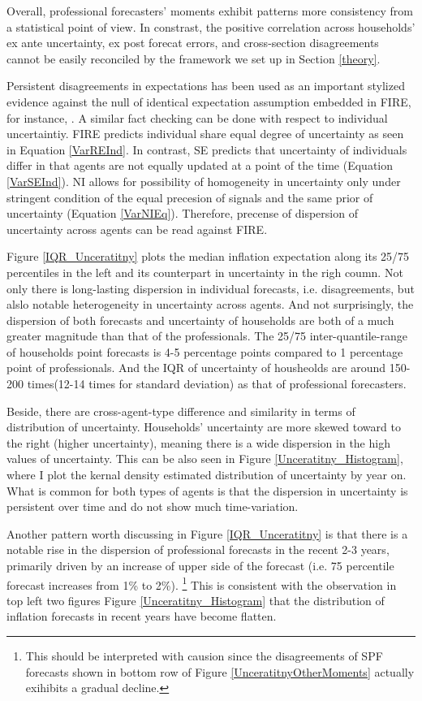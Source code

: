 \documentclass[]{article}
\begin{document}
Overall, professional forecasters' moments exhibit patterns more consistency from a statistical point of view.  In constrast, the positive correlation across households' ex ante uncertainty, ex post forecat errors, and cross-section disagreements cannot be easily reconciled by the framework we set up in Section \ref{theory}. 

Persistent disagreements in expectations has been used as an important stylized evidence against the null of identical expectation assumption embedded in FIRE, for instance, \citet{mankiw2003disagreement}. A similar fact checking can be done with respect to individual uncertaintiy. FIRE predicts individual share equal degree of uncertainty as  seen in Equation \ref{VarREInd}. In contrast, SE predicts that uncertainty of individuals differ in that agents are not equally updated at a point of the time (Equation \ref{VarSEInd}). NI allows for possibility of homogeneity in uncertainty only under stringent condition of the equal precesion of signals and the same prior of uncertainty (Equation \ref{VarNIEq}). Therefore, precense of dispersion of uncertainty across agents can be read against FIRE.  
 
Figure \ref{IQR_Unceratitny} plots the median inflation expectation along its 25/75 percentiles in the left and its counterpart in uncertainty in the righ coumn.  Not only there is long-lasting dispersion in individual forecasts, i.e. disagreements, but alslo notable heterogeneity in uncertainty across agents.  And not surprisingly, the dispersion of both forecasts and uncertainty of households are both of a much greater magnitude than that of the professionals. The 25/75 inter-quantile-range of households point forecasts is 4-5 percentage points compared to 1 percentage point of professionals. And the IQR of uncertainty of housheolds are around 150-200 times(12-14 times for standard deviation) as that of professional forecasters.  

Beside, there are cross-agent-type difference and similarity in terms of distribution of uncertainty. Households' uncertainty are more skewed toward to the right (higher uncertainty), meaning there is a wide dispersion in the high values of uncertainty. This can be also seen in Figure \ref{Unceratitny_Histogram}, where I plot the kernal density estimated distribution of uncertainty by year on. What is common for both types of agents is that the dispersion in uncertainty is persistent over time and do not show much time-variation.  

Another pattern worth discussing in Figure \ref{IQR_Unceratitny} is that there is a notable rise in the dispersion of professional forecasts in the recent 2-3 years, primarily driven by an increase of upper side of the forecast (i.e. 75 percentile forecast increases from 1\% to 2\%). \footnote{This should be interpreted with causion since the disagreements of SPF forecasts shown in bottom row of Figure \ref{UnceratitnyOtherMoments} actually exihibits a gradual decline. } This is consistent with the observation in top left two figures Figure \ref{Unceratitny_Histogram} that the distribution of inflation forecasts in recent years have become flatten.
\end{document}
